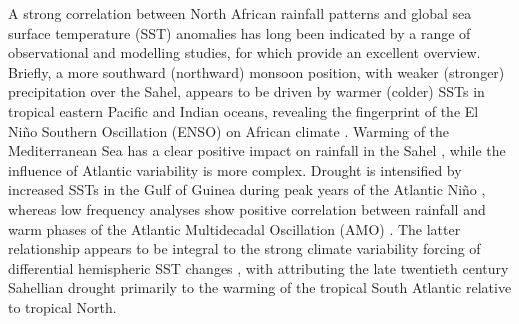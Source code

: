 \documentclass[a4paper]{article}
\begin{document}
A strong correlation between North African rainfall patterns and global sea surface temperature (SST) anomalies has long been indicated by a range of observational and modelling studies, for which \citeauthor{rodriguez2015variability} \parencite{rodriguez2015variability} provide an excellent overview. %
Briefly, a more southward (northward) monsoon position, with weaker (stronger) precipitation over the Sahel, appears to be driven by warmer (colder) SSTs in tropical eastern Pacific \parencite{rowell1995variability, fontaine1996sea, rowell2001teleconnections, janicot2001summer, giannini2003oceanic} and Indian \parencite{rowell1995variability, fontaine1996sea, bader2003impact, giannini2003oceanic} oceans, revealing the fingerprint of the El Ni\~{n}o Southern Oscillation (ENSO) on African climate \parencite{janowiak1988investigation, rowell1995variability, ward1998diagnosis}.
Warming of the Mediterranean Sea has a clear positive impact on rainfall in the Sahel \parencite{rowell2003impact, gaetani2010influence, fontaine2010impacts}, while the influence of Atlantic variability is more complex.
Drought is intensified by increased SSTs in the Gulf of Guinea during peak years of the Atlantic Ni\~{n}o \parencite{lamb1978case, bah1987towards, rowell1995variability, fontaine1996sea, ward1998diagnosis, giannini2003oceanic}, whereas low frequency analyses show positive correlation between rainfall and warm phases of the Atlantic Multidecadal Oscillation (AMO) \parencite{zhang2006impact, martin2014impact}.
The latter relationship appears to be integral to the strong climate variability forcing of differential hemispheric SST changes \parencite{folland1986sahel, lamb1978large, rowell1995variability, fontaine1998evolution, ward1998diagnosis}, with \citeauthor{hoerling2006detection} \parencite{hoerling2006detection} attributing the late twentieth century Sahellian drought primarily to the warming of the tropical South Atlantic relative to tropical North. 
\end{document}
